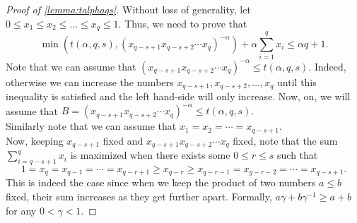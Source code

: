 \documentclass[11pt]{article}\usepackage{amsfonts}
\numberwithin{theorem}{subsection}
\begin{document}
\noindent
\begin{proof}[Proof of \cref{lemma:talphaqs}]
Without loss of generality, let $0\le x_1 \le x_2\le \ldots\le x_q \le 1.$ Thus, we need to prove that 
$$
\min
\left(
t(\alpha, q, s),
(x_{q-s+1}x_{q-s+2}\cdots x_q)^{-\alpha}
\right) + 
\alpha \sum_{i = 1}^q x_i \le \alpha q + 1.
$$
Note that we can assume that $(x_{q-s+1}x_{q-s+2}\cdots x_q)^{-\alpha} \le t(\alpha,q,s).$ Indeed, otherwise we can increase the numbers $x_{q-s+1},x_{q-s+2},\ldots ,x_q$ until this inequality is satisfied and the left hand-side will only increase. Now, on, we will assume that $B = (x_{q-s+1}x_{q-s+2}\cdots x_q)^{-\alpha} \le t(\alpha,q,s).$\\

\noindent
Similarly note that we can assume that $x_1 = x_2 = \cdots = x_{q-s+1}.$\\

\noindent
Now, keeping $x_{q-s+1}$ fixed and $x_{q-s+1}x_{q-s+2}\cdots x_q$ fixed, note that the sum $\sum_{i = q-s+1}^qx_i$ is maximized when there exists some $0\le r\le s$ such that 
$$
1 = x_q = x_{q-1} = \cdots = x_{q-r+1}\ge 
x_{q-r}\ge x_{q-r-1} = x_{g-r-2} = \cdots = x_{q-s+1}.
$$
This is indeed the case since when we keep the product of two numbers $a\le b$ fixed, their sum increases as they get further apart. Formally, $a\gamma + b\gamma^{-1}\ge a + b$ for any $0<\gamma<1.$


\end{proof}
\end{document}

